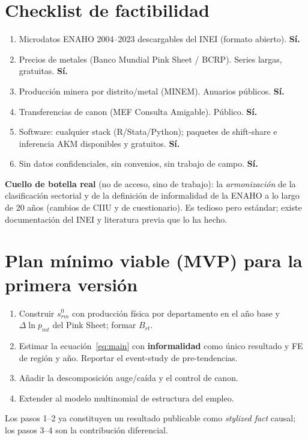 \documentclass[11pt]{article}
\begin{document}
\section{Checklist de factibilidad}

\begin{enumerate}[label=$\square$, leftmargin=1.6em, itemsep=2pt]
  \item Microdatos ENAHO 2004--2023 descargables del INEI (formato abierto). \textbf{Sí.}
  \item Precios de metales (Banco Mundial Pink Sheet / BCRP). Series largas, gratuitas. \textbf{Sí.}
  \item Producción minera por distrito/metal (MINEM). Anuarios públicos. \textbf{Sí.}
  \item Transferencias de canon (MEF Consulta Amigable). Público. \textbf{Sí.}
  \item Software: cualquier stack (R/Stata/Python); paquetes de shift-share e inferencia AKM
  disponibles y gratuitos. \textbf{Sí.}
  \item Sin datos confidenciales, sin convenios, sin trabajo de campo. \textbf{Sí.}
\end{enumerate}

\noindent\textbf{Cuello de botella real} (no de acceso, sino de trabajo): la
\emph{armonización} de la clasificación sectorial y de la definición de informalidad de la
ENAHO a lo largo de 20 años (cambios de CIIU y de cuestionario). Es tedioso pero estándar;
existe documentación del INEI y literatura previa que lo ha hecho.

\section{Plan mínimo viable (MVP) para la primera versión}
\begin{enumerate}[leftmargin=1.6em, itemsep=1pt]
  \item Construir $s_{rm}^{0}$ con producción física por departamento en el año base y
  $\Delta\ln p_{mt}$ del Pink Sheet; formar $B_{rt}$.
  \item Estimar la ecuación~\eqref{eq:main} con \textbf{informalidad} como único resultado y
  FE de región y año. Reportar el event-study de pre-tendencias.
  \item Añadir la descomposición auge/caída y el control de canon.
  \item Extender al modelo multinomial de estructura del empleo.
\end{enumerate}
Los pasos 1--2 ya constituyen un resultado publicable como \emph{stylized fact} causal; los
pasos 3--4 son la contribución diferencial.
\end{document}
